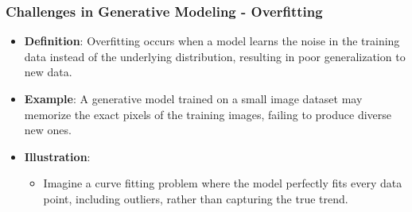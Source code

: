 \documentclass[aspectratio=169]{beamer}
\begin{document}
\begin{frame}[fragile]
  \frametitle{Challenges in Generative Modeling - Overfitting}
  
  \begin{itemize}
    \item \textbf{Definition}: Overfitting occurs when a model learns the noise in the training data instead of the underlying distribution, resulting in poor generalization to new data.
    \item \textbf{Example}: A generative model trained on a small image dataset may memorize the exact pixels of the training images, failing to produce diverse new ones.
    \item \textbf{Illustration}: 
      \begin{itemize}
        \item Imagine a curve fitting problem where the model perfectly fits every data point, including outliers, rather than capturing the true trend.
      \end{itemize}
  \end{itemize}
  
\end{frame}
\end{document}
